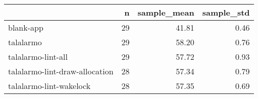 \begin{tabular}{lrrr}
\toprule
{} &   n &  sample\_mean &  sample\_std \\
\midrule
blank-app                      &  29 &        41.81 &        0.46 \\
talalarmo                      &  29 &        58.20 &        0.76 \\
talalarmo-lint-all             &  29 &        57.72 &        0.93 \\
talalarmo-lint-draw-allocation &  28 &        57.34 &        0.79 \\
talalarmo-lint-wakelock        &  28 &        57.35 &        0.69 \\
\bottomrule
\end{tabular}
